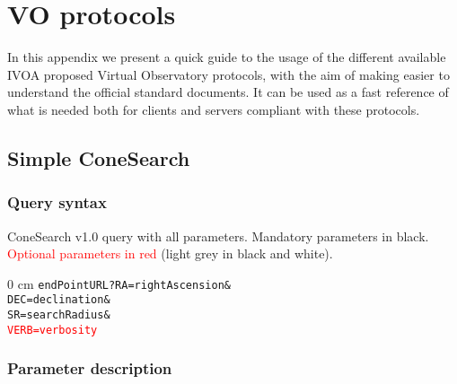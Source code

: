 \chapter{VO protocols}
\label{cha:vo_protocols}

In this appendix we present a quick guide to the usage of the different
available IVOA proposed Virtual Observatory protocols, with the aim of
making easier to understand the official standard documents. It can be
used as a fast reference of what is needed both for clients and servers
compliant with these protocols.

	\section{Simple ConeSearch} %
	\label{sec:simple_conesearch}

	\subsection{Query syntax} %
	\label{sub:query_syntax_scs}
	
	
	ConeSearch v1.0 query with all parameters. Mandatory 
	parameters in black. \textcolor{red}{Optional parameters in 
	red} (light grey in black and white).

	\begin{adjustwidth}{\parindent}{0 cm}
		\texttt{endPointURL?RA=rightAscension\&\\
				DEC=declination\&\\
				SR=searchRadius\&\\
				\textcolor{red}{VERB=verbosity}}
	\end{adjustwidth}

	
	\subsection{Parameter description} %
	\label{sub:parameter_description_scs}
	
